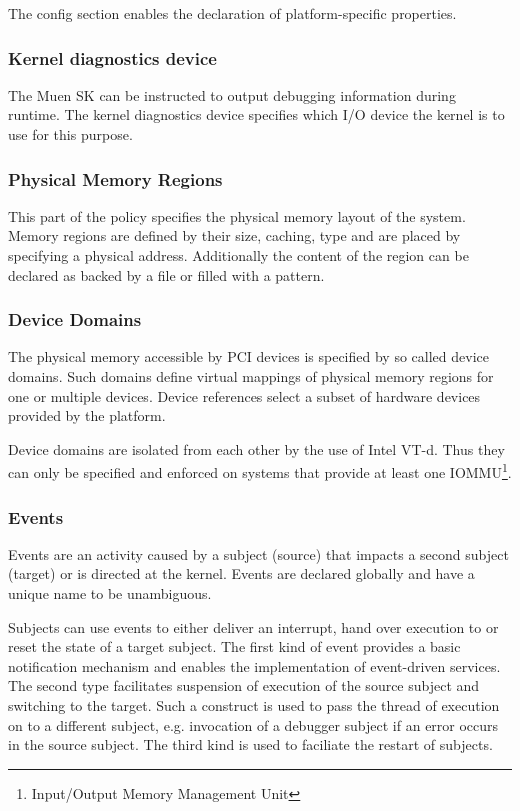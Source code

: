 \documentclass[a4paper,twoside,titlepage]{article}
\begin{document}
The config section enables the declaration of platform-specific properties.

\subsubsection{Kernel diagnostics device}
The Muen SK can be instructed to output debugging information during runtime.
The kernel diagnostics device specifies which I/O device the kernel is to use
for this purpose.

\subsubsection{Physical Memory Regions}
This part of the policy specifies the physical memory layout of the system.
Memory regions are defined by their size, caching, type and are placed by
specifying a physical address. Additionally the content of the region can be
declared as backed by a file or filled with a pattern.

\subsubsection{Device Domains}
The physical memory accessible by PCI devices is specified by so called device
domains. Such domains define virtual mappings of physical memory regions for one
or multiple devices. Device references select a subset of hardware devices
provided by the platform.

Device domains are isolated from each other by the use of Intel VT-d. Thus they
can only be specified and enforced on systems that provide at least one
IOMMU\footnote{Input/Output Memory Management Unit}.

\subsubsection{Events}
Events are an activity caused by a subject (source) that impacts a second
subject (target) or is directed at the kernel. Events are declared globally and
have a unique name to be unambiguous.

Subjects can use events to either deliver an interrupt, hand over execution to
or reset the state of a target subject. The first kind of event provides a
basic notification mechanism and enables the implementation of event-driven
services. The second type facilitates suspension of execution of the source
subject and switching to the target. Such a construct is used to pass the
thread of execution on to a different subject, e.g. invocation of a debugger
subject if an error occurs in the source subject. The third kind is used to
faciliate the restart of subjects.
\end{document}
